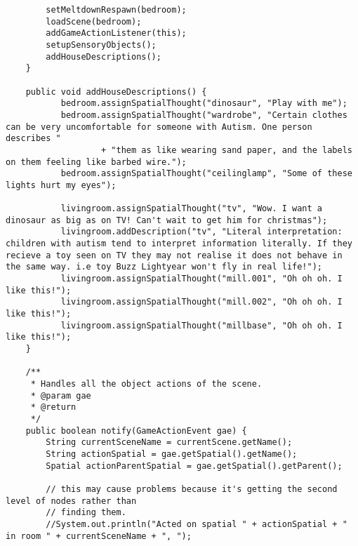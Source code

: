 \begin{lstlisting}
        setMeltdownRespawn(bedroom);
        loadScene(bedroom);        
        addGameActionListener(this);
        setupSensoryObjects();
        addHouseDescriptions();
    }
    
    public void addHouseDescriptions() {
           bedroom.assignSpatialThought("dinosaur", "Play with me");
           bedroom.assignSpatialThought("wardrobe", "Certain clothes can be very uncomfortable for someone with Autism. One person describes "
                   + "them as like wearing sand paper, and the labels on them feeling like barbed wire.");
           bedroom.assignSpatialThought("ceilinglamp", "Some of these lights hurt my eyes");
           
           livingroom.assignSpatialThought("tv", "Wow. I want a dinosaur as big as on TV! Can't wait to get him for christmas");
           livingroom.addDescription("tv", "Literal interpretation: children with autism tend to interpret information literally. If they recieve a toy seen on TV they may not realise it does not behave in the same way. i.e toy Buzz Lightyear won't fly in real life!");
           livingroom.assignSpatialThought("mill.001", "Oh oh oh. I like this!");
           livingroom.assignSpatialThought("mill.002", "Oh oh oh. I like this!");
           livingroom.assignSpatialThought("millbase", "Oh oh oh. I like this!");
    }

    /**
     * Handles all the object actions of the scene.
     * @param gae
     * @return 
     */
    public boolean notify(GameActionEvent gae) {
        String currentSceneName = currentScene.getName();
        String actionSpatial = gae.getSpatial().getName();
        Spatial actionParentSpatial = gae.getSpatial().getParent();
        
        // this may cause problems because it's getting the second level of nodes rather than
        // finding them.
        //System.out.println("Acted on spatial " + actionSpatial + " in room " + currentSceneName + ", ");
        

\end{lstlisting}
